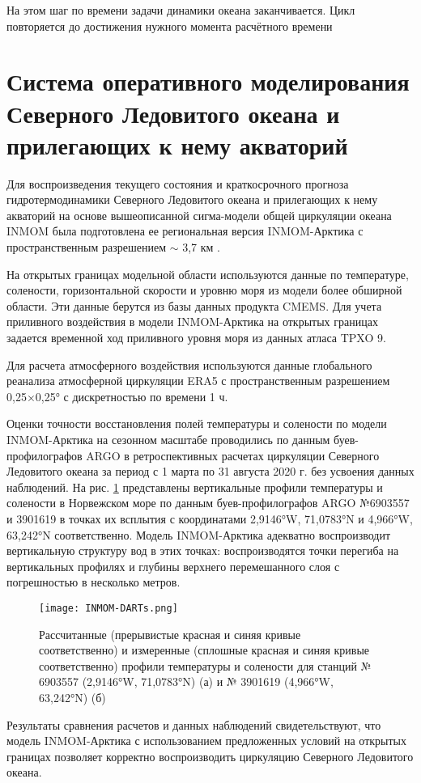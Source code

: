 На этом шаг по времени задачи динамики океана заканчивается. Цикл повторяется до достижения нужного момента расчётного времени

\section{Система оперативного моделирования Северного Ледовитого океана и прилегающих к нему акваторий}\label{sec:inmsom/ch1/sec4}

Для воспроизведения текущего состояния и краткосрочного прогноза гидротермодинамики Северного Ледовитого океана и прилегающих к нему акваторий на основе вышеописанной сигма-модели общей циркуляции океана INMOM была подготовлена ее региональная версия INMOM-Арктика с пространственным разрешением $\sim$ 3,7 км \cite{ChaplyginINMOM2021}.

На открытых границах модельной области используются данные по температуре, солености,
горизонтальной скорости и уровню моря из модели более обширной области. Эти данные берутся из базы данных продукта CMEMS. Для учета приливного воздействия в модели INMOM-Арктика на открытых границах задается временной ход приливного уровня моря из данных атласа TPXO 9. 

Для расчета атмосферного воздействия используются данные глобального реанализа атмосферной циркуляции ERA5 с пространственным разрешением 0,25×0,25° с дискретностью по времени 1 ч. 

Оценки точности восстановления полей температуры и солености по модели INMOM-Арктика на сезонном масштабе проводились по данным буев-профилографов ARGO в ретроспективных расчетах циркуляции Северного Ледовитого океана за период с 1 марта по 31 августа 2020 г. без усвоения данных наблюдений.
На рис. \ref{fig:INMOM-DARTs} представлены вертикальные профили температуры и солености в Норвежском море по данным буев-профилографов ARGO №6903557 и 3901619 в точках их всплытия с координатами 2,9146°W, 71,0783°N и 4,966°W, 63,242°N соответственно. Модель INMOM-Арктика адекватно воспроизводит вертикальную структуру вод в этих точках: воспроизводятся точки перегиба на вертикальных профилях и глубины верхнего перемешанного слоя с погрешностью в несколько метров.

\begin{figure}[htb!]
	\center
	\texttt{[image: INMOM-DARTs.png]}
	\caption{Рассчитанные (прерывистые красная и синяя кривые соответственно) и измеренные (сплошные красная и синяя кривые соответственно) профили температуры и солености для станций № 6903557 (2,9146°W, 71,0783°N) (а) и № 3901619 (4,966°W, 63,242°N) (б)}
	\label{fig:INMOM-DARTs}
\end{figure}

Результаты сравнения расчетов и данных наблюдений свидетельствуют, что модель INMOM-Арктика с использованием предложенных условий на открытых границах позволяет корректно воспроизводить циркуляцию Северного Ледовитого океана.

\FloatBarrier